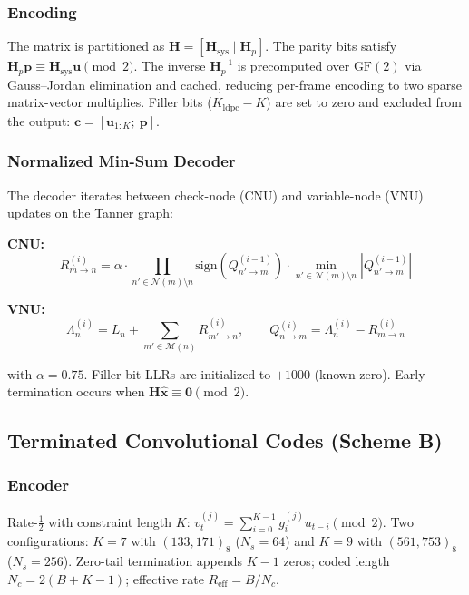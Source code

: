 \documentclass[12pt, a4paper]{article}
\begin{document}
\subsubsection{Encoding}
The matrix is partitioned as $\mathbf{H} = [\mathbf{H}_{\text{sys}} \mid \mathbf{H}_p]$. The parity bits satisfy $\mathbf{H}_p\mathbf{p} \equiv \mathbf{H}_{\text{sys}}\mathbf{u} \pmod{2}$. The inverse $\mathbf{H}_p^{-1}$ is precomputed over $\text{GF}(2)$ via Gauss--Jordan elimination and cached, reducing per-frame encoding to two sparse matrix-vector multiplies. Filler bits ($K_{\text{ldpc}}-K$) are set to zero and excluded from the output: $\mathbf{c} = [\mathbf{u}_{1:K};\ \mathbf{p}]$.

\subsubsection{Normalized Min-Sum Decoder}
The decoder iterates between check-node (CNU) and variable-node (VNU) updates on the Tanner graph:

\textbf{CNU:}
\begin{equation}
R_{m\to n}^{(i)} = \alpha \cdot \prod_{n'\in\mathcal{N}(m)\setminus n} \text{sign}(Q_{n'\to m}^{(i-1)}) \cdot \min_{n'\in\mathcal{N}(m)\setminus n} |Q_{n'\to m}^{(i-1)}|
\end{equation}

\textbf{VNU:}
\begin{equation}
\Lambda_n^{(i)} = L_n + \sum_{m'\in\mathcal{M}(n)} R_{m'\to n}^{(i)}, \qquad Q_{n\to m}^{(i)} = \Lambda_n^{(i)} - R_{m\to n}^{(i)}
\end{equation}

with $\alpha=0.75$. Filler bit LLRs are initialized to $+1000$ (known zero). Early termination occurs when $\mathbf{H}\hat{\mathbf{x}} \equiv \mathbf{0} \pmod{2}$.

\subsection{Terminated Convolutional Codes (Scheme B)}

\subsubsection{Encoder}
Rate-$\frac{1}{2}$ with constraint length $K$: $v_t^{(j)} = \sum_{i=0}^{K-1} g_i^{(j)} u_{t-i} \pmod{2}$. Two configurations: $K\!=\!7$ with $(133,171)_8$ ($N_s\!=\!64$) and $K\!=\!9$ with $(561,753)_8$ ($N_s\!=\!256$). Zero-tail termination appends $K\!-\!1$ zeros; coded length $N_c = 2(B+K-1)$; effective rate $R_{\text{eff}} = B/N_c$.
\end{document}
